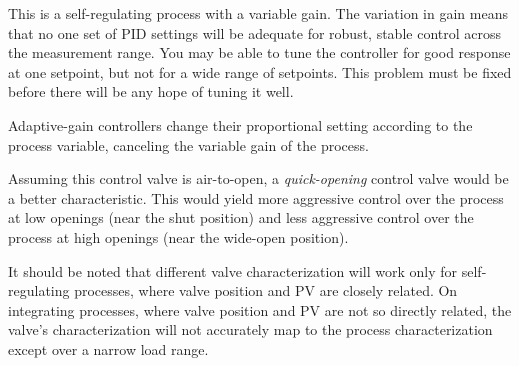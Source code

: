 
This is a self-regulating process with a variable gain.  The variation in gain means that no one set of PID settings will be adequate for robust, stable control across the measurement range.  You may be able to tune the controller for good response at one setpoint, but not for a wide range of setpoints.  This problem must be fixed before there will be any hope of tuning it well.







Adaptive-gain controllers change their proportional setting according to the process variable, canceling the variable gain of the process.

\vskip 10pt

Assuming this control valve is air-to-open, a {\it quick-opening} control valve would be a better characteristic.  This would yield more aggressive control over the process at low openings (near the shut position) and less aggressive control over the process at high openings (near the wide-open position).

It should be noted that different valve characterization will work only for self-regulating processes, where valve position and PV are closely related.  On integrating processes, where valve position and PV are not so directly related, the valve's characterization will not accurately map to the process characterization except over a narrow load range.




